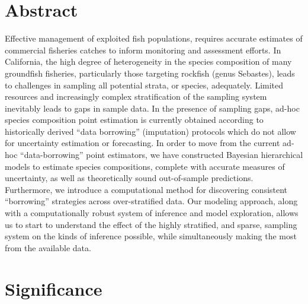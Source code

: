 \section{Abstract}\label{abstract}

Effective management of exploited fish populations, requires accurate
estimates of commercial fisheries catches to inform monitoring and
assessment efforts. In California, the high degree of heterogeneity in
the species composition of many groundfish fisheries, particularly those
targeting rockfish (genus Sebastes), leads to challenges in sampling all
potential strata, or species, adequately. Limited resources and
increasingly complex stratification of the sampling system inevitably
leads to gaps in sample data. In the presence of sampling gaps, ad-hoc
species composition point estimation is currently obtained according to
historically derived ``data borrowing'' (imputation) protocols which do
not allow for uncertainty estimation or forecasting. In order to move
from the current ad-hoc ``data-borrowing'' point estimators, we have
constructed Bayesian hierarchical models to estimate species
compositions, complete with accurate measures of uncertainty, as well as
theoretically sound out-of-sample predictions. Furthermore, we introduce
a computational method for discovering consistent ``borrowing''
strategies across over-stratified data. Our modeling approach, along
with a computationally robust system of inference and model exploration,
allows us to start to understand the effect of the highly stratified,
and sparse, sampling system on the kinds of inference possible, while
simultaneously making the most from the available data.

\section{Significance}\label{significance}

